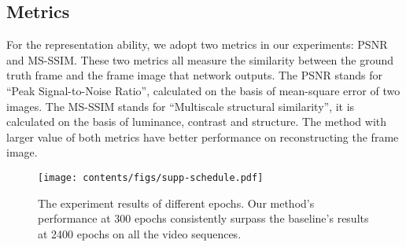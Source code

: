 \documentclass[runningheads]{llncs}
\begin{document}
\subsection{Metrics}

For the representation ability, we adopt two metrics in our experiments: PSNR and MS-SSIM. These two metrics all measure the similarity between the ground truth frame and the frame image that network outputs. The PSNR stands for ``Peak Signal-to-Noise Ratio'', calculated on the basis of mean-square error of two images. The MS-SSIM stands for ``Multiscale structural similarity'', it is calculated on the basis of luminance, contrast and structure. The method with larger value of both metrics have better performance on reconstructing the frame image.

\begin{figure}[t]
    \centering
    \texttt{[image: contents/figs/supp-schedule.pdf]}
    \caption{The experiment results of different epochs. Our method's performance at 300 epochs consistently surpass the baseline's results at 2400 epochs on all the video sequences.}
    \label{fig:supp_schedule}
\end{figure}
\end{document}
